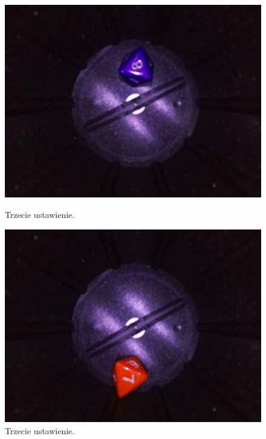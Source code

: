 \begin{figure}[H]
    \hfill
    \begin{minipage}{0.32\textwidth}
        \centering
        \includegraphics[width=\linewidth]{chapters/03-praca-wlasna/figures/kolorki/fiolet.jpg}
        \caption{\label{fig:fiolet}Trzecie ustawienie.}
    \end{minipage}
    \hfill
    \begin{minipage}{0.32\textwidth}
        \centering
        \includegraphics[width=\linewidth]{chapters/03-praca-wlasna/figures/kolorki/pomaranczowa.jpg}
        \caption{\label{fig:orange}Trzecie ustawienie.}
    \end{minipage}
    \hfill
    \begin{minipage}{0.32\textwidth}

\end{minipage}
\end{figure}
